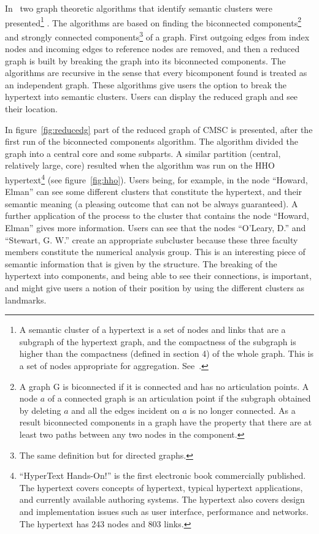 \documentclass[twocolumn,10pt]{article}
\begin{document}
In~\cite{bot91} two graph theoretic algorithms that identify semantic
clusters were presented\footnote{A semantic cluster of a hypertext is a set of nodes and links
that are a subgraph of the hypertext graph, and the compactness of the 
subgraph is higher than the compactness (defined in section 4) 
of the whole graph. This is
a set of nodes appropriate for aggregation. See~\cite{bot91}.}
. The algorithms are based on finding the
biconnected components\footnote{A graph G is biconnected if it is connected and has no 
articulation points. A node $a$ of a connected graph is an 
articulation point if the subgraph obtained by deleting $a$ and
all the edges incident on $a$ is no longer connected. As a result
biconnected components in a graph have the property that there are
at least two paths between any two nodes in the component.}
and strongly connected components\footnote{The same definition but for directed graphs.} 
of a graph. First outgoing edges from index nodes and incoming
edges to reference nodes are removed, and then a reduced graph is built 
by breaking the graph into its biconnected components. The algorithms are
recursive in the sense that every bicomponent found is treated as an 
independent graph. These algorithms give users the option to break the 
hypertext
into semantic clusters. Users can display the reduced graph and see 
their location.

In figure~\ref{fig:reducedg} part of the reduced graph of CMSC is
presented, after the first run of the biconnected components algorithm.
The algorithm divided the graph into a central core and some subparts.
A similar partition (central, relatively large, core) resulted when the
algorithm was run on the HHO hypertext\footnote{``HyperText Hands-On!'' is the first
electronic book commercially published. The hypertext covers
concepts of hypertext, 
typical hypertext applications, and currently available authoring
systems. The hypertext also covers design and implementation issues such
as user interface, performance and networks. The hypertext has 243 nodes
and 803 links.}
(see figure~\ref{fig:hho}). Users
being, for example, in the node ``Howard, Elman'' can see some
different clusters that constitute the hypertext, and  their semantic
meaning (a pleasing outcome that can not be always guaranteed). 
A further application of the process to
the cluster that contains the node ``Howard, Elman'' gives more
information. Users can see that the nodes ``O'Leary, D.'' and
``Stewart, G. W.'' create an appropriate subcluster
because these three faculty members constitute the numerical analysis
group. This is an interesting piece of semantic information
that is given by the structure. The breaking of the hypertext
into components, and being able to see their connections,
 is important, and might give users a notion
of their position by using the different clusters as landmarks.
\end{document}
